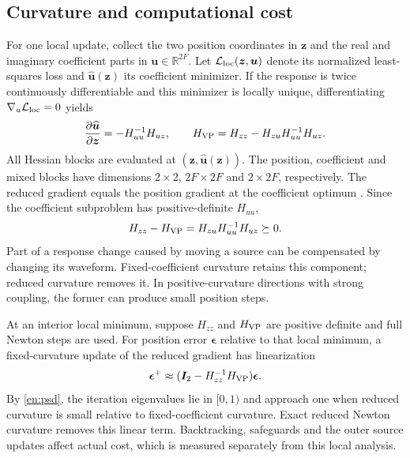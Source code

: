 \documentclass[a4paper,fleqn,review]{cas-sc}
\newcommand{\R}{\mathbb R}
\begin{document}
\FloatBarrier
\subsection{Curvature and computational cost}
For one local update, collect the two position coordinates in $\bm z$ and the real and imaginary coefficient parts in $\bm u\in\R^{2F}$. Let $\mathcal L_{\rm loc}(\bm z,\bm u)$ denote its normalized least-squares loss and $\widehat{\bm u}(\bm z)$ its coefficient minimizer. If the response is twice continuously differentiable and this minimizer is locally unique, differentiating $\nabla_u\mathcal L_{\rm loc}=0$ yields
\begin{equation}
\frac{\partial\widehat{\bm u}}{\partial\bm z}=-H_{uu}^{-1}H_{uz},\qquad
H_{\rm VP}=H_{zz}-H_{zu}H_{uu}^{-1}H_{uz}.
\label{en:schur}
\end{equation}
All Hessian blocks are evaluated at $(\bm z,\widehat{\bm u}(\bm z))$. The position, coefficient and mixed blocks have dimensions $2\times2$, $2F\times2F$ and $2\times2F$, respectively. The reduced gradient equals the position gradient at the coefficient optimum \cite{GolubPereyra1973}. Since the coefficient subproblem has positive-definite $H_{uu}$,
\begin{equation}
H_{zz}-H_{\rm VP}=H_{zu}H_{uu}^{-1}H_{uz}\succeq0.
\label{en:psd}
\end{equation}
Part of a response change caused by moving a source can be compensated by changing its waveform. Fixed-coefficient curvature retains this component; reduced curvature removes it. In positive-curvature directions with strong coupling, the former can produce small position steps.

At an interior local minimum, suppose $H_{zz}$ and $H_{\rm VP}$ are positive definite and full Newton steps are used. For position error $\bm\epsilon$ relative to that local minimum, a fixed-curvature update of the reduced gradient has linearization
\begin{equation}
\bm\epsilon^+\approx(\bm I_2-H_{zz}^{-1}H_{\rm VP})\bm\epsilon.
\label{en:rate}
\end{equation}
By \eqref{en:psd}, the iteration eigenvalues lie in $[0,1)$ and approach one when reduced curvature is small relative to fixed-coefficient curvature. Exact reduced Newton curvature removes this linear term. Backtracking, safeguards and the outer source updates affect actual cost, which is measured separately from this local analysis.
\end{document}
